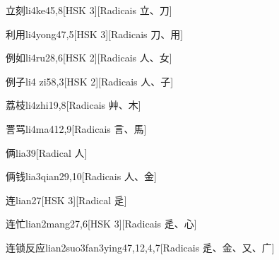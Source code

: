 \begin{entry}{立刻}{li4ke4}{5,8}[HSK 3][Radicais ⽴、⼑]
\end{entry}

\begin{entry}{利用}{li4yong4}{7,5}[HSK 3][Radicais ⼑、⽤]
\end{entry}

\begin{entry}{例如}{li4ru2}{8,6}[HSK 2][Radicais ⼈、⼥]
\end{entry}

\begin{entry}{例子}{li4 zi5}{8,3}[HSK 2][Radicais ⼈、⼦]
\end{entry}

\begin{entry}{荔枝}{li4zhi1}{9,8}[Radicais ⾋、⽊]
\end{entry}

\begin{entry}{詈骂}{li4ma4}{12,9}[Radicais ⾔、⾺]
\end{entry}

\begin{entry}{俩}{lia3}{9}[Radical ⼈]
\end{entry}

\begin{entry}{俩钱}{lia3qian2}{9,10}[Radicais ⼈、⾦]
\end{entry}

\begin{entry}{连}{lian2}{7}[HSK 3][Radical ⾡]
\end{entry}

\begin{entry}{连忙}{lian2mang2}{7,6}[HSK 3][Radicais ⾡、⼼]
\end{entry}

\begin{entry}{连锁反应}{lian2suo3fan3ying4}{7,12,4,7}[Radicais ⾡、⾦、⼜、⼴]
\end{entry}

